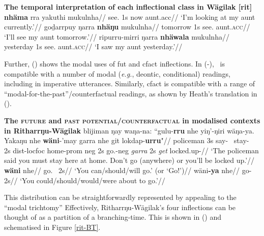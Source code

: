 \pex \textbf{The temporal interpretation of each inflectional class in Wägilak [\gls{rit}]}\label{wag-infls}
\a\begingl\gla {}\textbf{nhäma} rra yakuthi mukulnha//
\glb see.\textbf{{\I}} 1s now aunt.\gls{acc}//
\glft`I'm looking at my aunt currently.'\trailingcitation{[RN~20190520]}//\endgl{}
\a\begingl\gla {}goḏarrpuy ŋarra \textbf{nhäŋu} mukulnha//
\glb tomorrow 1s see.\II{} aunt.\textsc{acc}//
\glft`I'll see my aunt tomorrow.'\trailingcitation{[DW~20190522]}//\endgl
\a\begingl\gla {}ripurru-mirri ŋarra \textbf{nhäwala} mukulnha//
\glb yesterday 1s see.\textbf{\III} aunt.\textsc{acc}//
\glft`I saw my aunt yesterday.'\trailingcitation{[RN~20190522]}//\endgl{}
\xe

\noindent Further, () shows the modal uses of \gls{fut} and \gls{cfact} inflections. In (-), \II~is compatible with a number of modal (\textit{e.g.}, deontic, conditional) readings, including in imperative utterances. Similarly, \gls{cfact} is compatible with a range of ``modal-for-the-past''/counterfactual readings, as shown by Heath's translation in ().


\pex \textbf{The \textsc{future} and \textsc{past potential/counterfactual} in modalised contexts in Ritharrŋu-Wägilak}
\a \begingl\gla blijiman ŋay waŋa-na: ``gulu-\textbf{rru} nhe yiŋ'-ŋiri wäŋa-ya. Yakaŋu nhe \textbf{wäni}-'may garra nhe git lokdap-\textbf{urru}"//
\glb policeman 3s say-\III~ stay-\II~ 2s \gls{dist}-\gls{loc}\textdblhyphen\gls{foc} home-\gls{prom} \gls{neg} 2s go.\II-\gls{neg} \textit{garra} 2s \textit{get} locked.up-\II//
\glft`The policeman said you must stay here at home. Don't go (anywhere) or you'll be locked up.'\trailingcitation{[RŊ~20190520~18']}//\endgl
\a\begingl\gla \textbf{wäni} nhe//
\glb go.\II~ 2s//
\glft `You can/should/will go.' (or `Go!')//\endgl
\a\begingl\gla wäni\textbf{-ya} nhe//
\glb go-\V~ 2s//
\glft`You could/should/would/were about to go.'//\endgl
\xe

This distribution can be straightforwardly represented by appealing to the ``modal trichtomy'' \citetext{that is, modelling branching time as composed of an \textit{actual, potential} and \textit{counterfactual} domain, \textit{cf.} \citet{VonPrince2019,VonPrincea} (forthcoming) --- introduced in \S \ref{vP-trich}, compare (), \textit{p.}~.} Effectively, Ritharrŋu-Wägilak's four inflections can be thought of as a partition of a branching-time. This is shown in (\nextx) and schematised in Figure \ref{rit-BT}.


